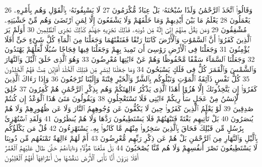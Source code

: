{\tiny\colorbox{cl_aya}{26}} وَقَالُوا۟ ٱتَّخَذَ ٱلرَّحْمَٰنُ وَلَدًا سُبْحَٰنَهُۥ بَلْ عِبَادٌ مُّكْرَمُونَ
{\tiny\colorbox{cl_aya}{27}} لَا يَسْبِقُونَهُۥ بِٱلْقَوْلِ وَهُم بِأَمْرِهِۦ يَعْمَلُونَ
{\tiny\colorbox{cl_aya}{28}} يَعْلَمُ مَا بَيْنَ أَيْدِيهِمْ وَمَا خَلْفَهُمْ وَلَا يَشْفَعُونَ إِلَّا لِمَنِ ٱرْتَضَىٰ وَهُم مِّنْ خَشْيَتِهِۦ مُشْفِقُونَ
{\tiny\colorbox{cl_aya}{29}} وَمَن يَقُلْ مِنْهُمْ إِنِّىٓ إِلَٰهٌ مِّن دُونِهِۦ فَذَٰلِكَ نَجْزِيهِ جَهَنَّمَ كَذَٰلِكَ نَجْزِى ٱلظَّٰلِمِينَ
{\tiny\colorbox{cl_aya}{30}} أَوَلَمْ يَرَ ٱلَّذِينَ كَفَرُوٓا۟ أَنَّ ٱلسَّمَٰوَٰتِ وَٱلْأَرْضَ كَانَتَا رَتْقًا فَفَتَقْنَٰهُمَا وَجَعَلْنَا مِنَ ٱلْمَآءِ كُلَّ شَىْءٍ حَىٍّ أَفَلَا يُؤْمِنُونَ
{\tiny\colorbox{cl_aya}{31}} وَجَعَلْنَا فِى ٱلْأَرْضِ رَوَٰسِىَ أَن تَمِيدَ بِهِمْ وَجَعَلْنَا فِيهَا فِجَاجًا سُبُلًا لَّعَلَّهُمْ يَهْتَدُونَ
{\tiny\colorbox{cl_aya}{32}} وَجَعَلْنَا ٱلسَّمَآءَ سَقْفًا مَّحْفُوظًا وَهُمْ عَنْ ءَايَٰتِهَا مُعْرِضُونَ
{\tiny\colorbox{cl_aya}{33}} وَهُوَ ٱلَّذِى خَلَقَ ٱلَّيْلَ وَٱلنَّهَارَ وَٱلشَّمْسَ وَٱلْقَمَرَ كُلٌّ فِى فَلَكٍ يَسْبَحُونَ
{\tiny\colorbox{cl_aya}{34}} وَمَا جَعَلْنَا لِبَشَرٍ مِّن قَبْلِكَ ٱلْخُلْدَ أَفَإِي۟ن مِّتَّ فَهُمُ ٱلْخَٰلِدُونَ
{\tiny\colorbox{cl_aya}{35}} كُلُّ نَفْسٍ ذَآئِقَةُ ٱلْمَوْتِ وَنَبْلُوكُم بِٱلشَّرِّ وَٱلْخَيْرِ فِتْنَةً وَإِلَيْنَا تُرْجَعُونَ
{\tiny\colorbox{cl_aya}{36}} وَإِذَا رَءَاكَ ٱلَّذِينَ كَفَرُوٓا۟ إِن يَتَّخِذُونَكَ إِلَّا هُزُوًا أَهَٰذَا ٱلَّذِى يَذْكُرُ ءَالِهَتَكُمْ وَهُم بِذِكْرِ ٱلرَّحْمَٰنِ هُمْ كَٰفِرُونَ
{\tiny\colorbox{cl_aya}{37}} خُلِقَ ٱلْإِنسَٰنُ مِنْ عَجَلٍ سَأُو۟رِيكُمْ ءَايَٰتِى فَلَا تَسْتَعْجِلُونِ
{\tiny\colorbox{cl_aya}{38}} وَيَقُولُونَ مَتَىٰ هَٰذَا ٱلْوَعْدُ إِن كُنتُمْ صَٰدِقِينَ
{\tiny\colorbox{cl_aya}{39}} لَوْ يَعْلَمُ ٱلَّذِينَ كَفَرُوا۟ حِينَ لَا يَكُفُّونَ عَن وُجُوهِهِمُ ٱلنَّارَ وَلَا عَن ظُهُورِهِمْ وَلَا هُمْ يُنصَرُونَ
{\tiny\colorbox{cl_aya}{40}} بَلْ تَأْتِيهِم بَغْتَةً فَتَبْهَتُهُمْ فَلَا يَسْتَطِيعُونَ رَدَّهَا وَلَا هُمْ يُنظَرُونَ
{\tiny\colorbox{cl_aya}{41}} وَلَقَدِ ٱسْتُهْزِئَ بِرُسُلٍ مِّن قَبْلِكَ فَحَاقَ بِٱلَّذِينَ سَخِرُوا۟ مِنْهُم مَّا كَانُوا۟ بِهِۦ يَسْتَهْزِءُونَ
{\tiny\colorbox{cl_aya}{42}} قُلْ مَن يَكْلَؤُكُم بِٱلَّيْلِ وَٱلنَّهَارِ مِنَ ٱلرَّحْمَٰنِ بَلْ هُمْ عَن ذِكْرِ رَبِّهِم مُّعْرِضُونَ
{\tiny\colorbox{cl_aya}{43}} أَمْ لَهُمْ ءَالِهَةٌ تَمْنَعُهُم مِّن دُونِنَا لَا يَسْتَطِيعُونَ نَصْرَ أَنفُسِهِمْ وَلَا هُم مِّنَّا يُصْحَبُونَ
{\tiny\colorbox{cl_aya}{44}} بَلْ مَتَّعْنَا هَٰٓؤُلَآءِ وَءَابَآءَهُمْ حَتَّىٰ طَالَ عَلَيْهِمُ ٱلْعُمُرُ أَفَلَا يَرَوْنَ أَنَّا نَأْتِى ٱلْأَرْضَ نَنقُصُهَا مِنْ أَطْرَافِهَآ أَفَهُمُ ٱلْغَٰلِبُونَ
